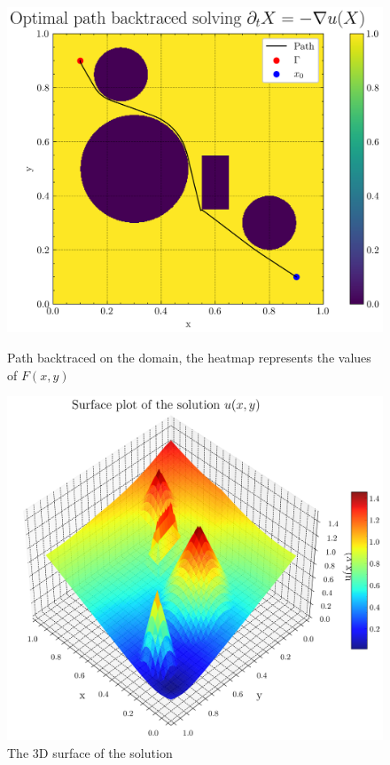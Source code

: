 \documentclass[11pt]{article}
\theoremstyle{definition}
\theoremstyle{remark}
\begin{document}
\begin{figure}[h]
  \centering
  \begin{minipage}{0.45\textwidth}
    \centering
    \includegraphics[width=\textwidth]{plots/path_mountain.png}
    \caption{Path backtraced on the domain, the heatmap represents the values of $F(x,y)$}
  \end{minipage}
  \hfill
  \begin{minipage}{0.45\textwidth}
    \centering
    \includegraphics[width=\textwidth]{plots/surface_mountain.png}
    \caption{The 3D surface of the solution}
    \label{3d_surface_mountain}
  \end{minipage}
\end{figure}
\end{document}
